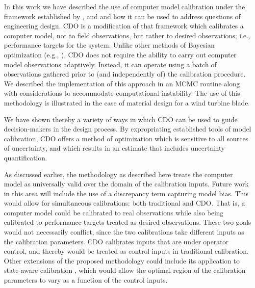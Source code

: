 \documentclass{article}
\begin{document}
In this work we have described the 
use of computer model calibration under the framework established by \cite{Kennedy2001}, \cite{Williams2006} and \cite{Bayarri2007} and how it can be used to address questions of engineering design. 
%
CDO is a modification of that framework which calibrates a computer model, not to field observations, but rather to desired observations; i.e., performance targets for the system. 
%
Unlike other methods of Bayesian optimization (e.g., \citealt{Shahriari2016}), CDO does not require the ability to carry out computer model observations adaptively.
%
Instead, it can operate using a batch of observations gathered prior to (and independently of) the calibration procedure.
%
We described the implementation of this approach in an MCMC routine along with considerations to accommodate computational instability.
%
The use of this methodology is illustrated in the case of material design for a wind turbine blade. 

We have shown thereby a variety of ways in which CDO can be used to guide decision-makers in the design process. 
%
By expropriating established tools of model calibration, CDO offers a method of optimization which is sensitive to all sources of uncertainty, and which results in an estimate that includes uncertainty quantification.

As discussed earlier, the methodology as described here treats the computer model as universally valid over the domain of the calibration inputs. 
%
Future work in this area will include the use of a discrepancy term capturing model bias.
%
This would allow for simultaneous calibrations: both traditional and CDO.
%
That is, a computer model could be calibrated to real observations while also being calibrated to performance targets treated as desired observations.
%
These two goals would not necessarily conflict, since the two calibrations take different inputs as the calibration parameters.
% 
CDO calibrates inputs that are under operator control, and thereby would be treated as control inputs in traditional calibration.
%
Other extensions of the proposed methodology could include its application to state-aware calibration \citep{Atamturktur2015,Stevens2018,Brown2016}, which would allow the optimal region of the calibration parameters to vary as a function of the control inputs.





\pagebreak


\end{document}
